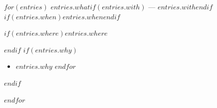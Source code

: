 $for(entries)$
\noindent\textbf{$entries.what$}$if(entries.with)$ --- $entries.with$$endif$$if(entries.when)$\hfill $entries.when$$endif$\par
$if(entries.where)$\noindent\emph{$entries.where$}\par
$endif$
$if(entries.why)$\begin{itemize}
$for(entries.why)$\item $entries.why$
$endfor$\end{itemize}
$endif$
\medskip

$endfor$
